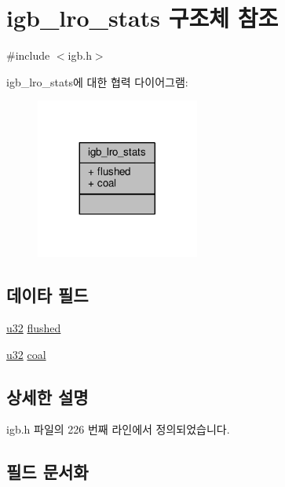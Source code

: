 \hypertarget{structigb__lro__stats}{}\section{igb\+\_\+lro\+\_\+stats 구조체 참조}
\label{structigb__lro__stats}


{\ttfamily \#include $<$igb.\+h$>$}



igb\+\_\+lro\+\_\+stats에 대한 협력 다이어그램\+:
\nopagebreak
\begin{figure}[H]
\begin{center}
\leavevmode
\includegraphics[width=152pt]{structigb__lro__stats__coll__graph}
\end{center}
\end{figure}
\subsection*{데이타 필드}
\begin{DoxyCompactItemize}
\item 
\hyperlink{lib_2igb_2e1000__osdep_8h_a64e91c10a0d8fb627e92932050284264}{u32} \hyperlink{structigb__lro__stats_ac23518f6c232ca9567d2ab6c6ebd079a}{flushed}
\item 
\hyperlink{lib_2igb_2e1000__osdep_8h_a64e91c10a0d8fb627e92932050284264}{u32} \hyperlink{structigb__lro__stats_a745689cb434a6cbf4e4da6ab35a61b89}{coal}
\end{DoxyCompactItemize}


\subsection{상세한 설명}


igb.\+h 파일의 226 번째 라인에서 정의되었습니다.



\subsection{필드 문서화}
